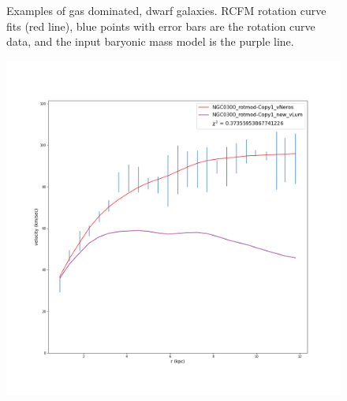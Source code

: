 \documentclass[reprint,%
 amsmath,amssymb,
 aps,
]{revtex4-1}
\begin{document}
\begin{figure}
\begin{minipage}{.5\textwidth}
  \label{fig:test1}
\end{minipage}
 \caption{Examples of  gas dominated, dwarf galaxies.  RCFM rotation curve fits (red line), blue points with error bars are the rotation curve data, and the input baryonic mass model is the purple line.  }
\end{figure}
 
            
\begin{figure}
\centering
\begin{minipage}{.5\textwidth}
  \centering
  \includegraphics[width=.95\linewidth]{Updated_Graphs_withnewcolorsandfonts/NGC0300_rotmod-Copy1_XueSofue.png}
  \label{fig:test1}
\end{minipage}%
\begin{minipage}{.5\textwidth}
  \centering

\end{minipage}
\end{figure}
\end{document}
